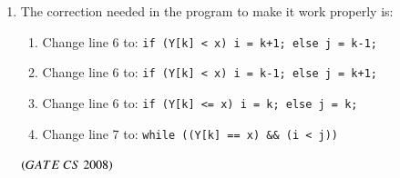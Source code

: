 \documentclass[journal, onecolumn]{IEEEtran}
\numberwithin{equation}{enumi}
\numberwithin{figure}{enumi}
\begin{document}
\begin{enumerate}
\item The correction needed in the program to make it work properly is:

\begin{enumerate}
    \item Change line 6 to: \texttt{if (Y[k] < x) i = k+1; else j = k-1;}
    \item Change line 6 to: \texttt{if (Y[k] < x) i = k-1; else j = k+1;}
    \item Change line 6 to: \texttt{if (Y[k] <= x) i = k; else j = k;}
    \item Change line 7 to: \texttt{while ((Y[k] == x) \&\& (i < j))}
\end{enumerate}
\hfill $\left(GATE\ CS\  2008\right)$

\end{enumerate}
\end{document}
